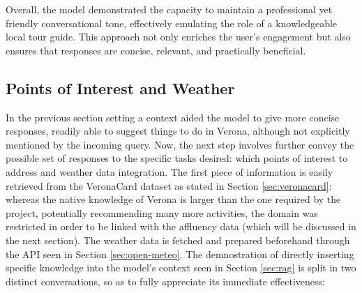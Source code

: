 Overall, the model demonstrated the capacity to maintain a professional yet friendly conversational tone, effectively emulating the role of a knowledgeable local tour guide. This approach not only enriches the user's engagement but also ensures that responses are concise, relevant, and practically beneficial.


\subsection{Points of Interest and Weather}
\label{sec:pois-weather}

In the previous section setting a context aided the model to give more concise responses, readily able to suggest things to do in Verona, although not explicitly mentioned by the incoming query. Now, the next step involves further convey the possible set of responses to the specific tasks desired: which points of interest to address and weather data integration. The first piece of information is easily retrieved from the VeronaCard dataset as stated in Section \ref{sec:veronacard}: whereas the native knowledge of Verona is larger than the one required by the project, potentially recommending many more activities, the domain was restricted in order to be linked with the affluency data (which will be discussed in the next section). The weather data is fetched and prepared beforehand through the API seen in Section \ref{sec:open-meteo}.
The demnostration of directly inserting specific knowledge into the model's context seen in Section \ref{sec:rag} is split in two distinct conversations, so as to fully appreciate its immediate effectiveness:

